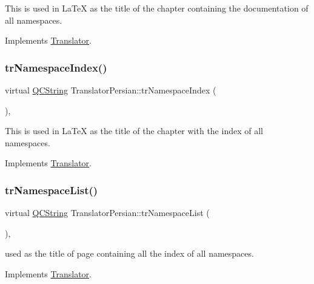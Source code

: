 This is used in La\+TeX as the title of the chapter containing the documentation of all namespaces. 

Implements \mbox{\hyperlink{class_translator}{Translator}}.

\mbox{\label{class_translator_persian_afcea2a6f3a94aac26b3217a4b612a3ff}} 
\subsubsection{\texorpdfstring{trNamespaceIndex()}{trNamespaceIndex()}}
{\footnotesize\ttfamily virtual \mbox{\hyperlink{class_q_c_string}{Q\+C\+String}} Translator\+Persian\+::tr\+Namespace\+Index (\begin{DoxyParamCaption}{ }\end{DoxyParamCaption})\hspace{0.3cm}{\ttfamily [inline]}, {\ttfamily [virtual]}}

This is used in La\+TeX as the title of the chapter with the index of all namespaces. 

Implements \mbox{\hyperlink{class_translator}{Translator}}.

\mbox{\label{class_translator_persian_aaaaafab70370a5654af554aa76762cf5}} 
\subsubsection{\texorpdfstring{trNamespaceList()}{trNamespaceList()}}
{\footnotesize\ttfamily virtual \mbox{\hyperlink{class_q_c_string}{Q\+C\+String}} Translator\+Persian\+::tr\+Namespace\+List (\begin{DoxyParamCaption}{ }\end{DoxyParamCaption})\hspace{0.3cm}{\ttfamily [inline]}, {\ttfamily [virtual]}}

used as the title of page containing all the index of all namespaces. 

Implements \mbox{\hyperlink{class_translator}{Translator}}.

\mbox{\label{class_translator_persian_a4a9b20695fd14d7f9ae59c35ef0d7eb4}} 
